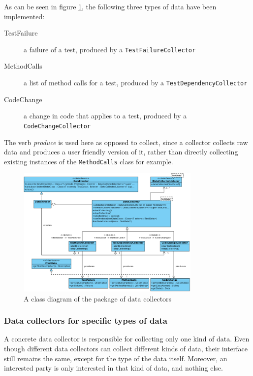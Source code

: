 \documentclass[i2]{oss}
\newcommand{\class}[1]{\texttt{#1}}
\begin{document}
As can be seen in figure \ref{fig:diagram:collectors}, the following three types of data have been implemented:
\begin{description}
\item[TestFailure] a failure of a test, produced by a \class{TestFailureCollector}
\item[MethodCalls] a list of method calls for a test, produced by a \class{TestDependencyCollector}
\item[CodeChange] a change in code that applies to a test, produced by a \class{CodeChangeCollector}
\end{description}
The verb \emph{produce} is used here as opposed to collect, since a collector collects raw data and produces a user friendly version of it, rather than directly collecting existing instances of the \class{MethodCalls} class for example.

\begin{figure}[tbp]
\begin{center}
    \includegraphics[width=0.8\textwidth]{DataCollectors}
    \caption{A class diagram of the package of data collectors}
	\label{fig:diagram:collectors}
\end{center}
\end{figure}

\subsubsection{Data collectors for specific types of data}

A concrete data collector is responsible for collecting only one kind of data.
Even though different data collectors can collect different kinds of data, their interface still remains the same, except for the type of the data itself. 
Moreover, an interested party is only interested in that kind of data, and nothing else.
\end{document}
